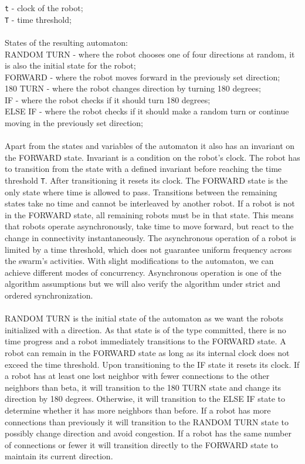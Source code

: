 \texttt{t} - clock of the robot;\\
\texttt{T} - time threshold;
\\\\
States of the resulting automaton:\\
RANDOM TURN - where the robot chooses one of four directions at random, it is also the initial state for the robot;\\
FORWARD - where the robot moves forward in the previously set direction;\\
180 TURN - where the robot changes direction by turning 180 degrees;\\
IF - where the robot checks if it should turn 180 degrees; \\
ELSE IF - where the robot checks if it should make a random turn or continue moving in the previously set direction;
\\\\
Apart from the states and variables of the automaton it also has an invariant on the FORWARD state. Invariant is a condition on the robot's clock. The robot has to transition from the state with a defined invariant before reaching the time threshold \texttt{T}. After transitioning it resets its clock. The FORWARD state is the only state where time is allowed to pass. Transitions between the remaining states take no time and cannot be interleaved by another robot. If a robot is not in the FORWARD state, all remaining robots must be in that state. This means that robots operate asynchronously, take time to move forward, but react to the change in connectivity instantaneously. The asynchronous operation of a robot is limited by a time threshold, which does not guarantee uniform frequency across the swarm's activities. With slight modifications to the automaton, we can achieve different modes of concurrency. Asynchronous operation is one of the algorithm assumptions but we will also verify the algorithm under strict and ordered synchronization.
\\\\
RANDOM TURN is the initial state of the automaton as we want the robots initialized with a direction. As that state is of the type committed, there is no time progress and a robot immediately transitions to the FORWARD state. A robot can remain in the FORWARD state as long as its internal clock does not exceed the time threshold. Upon transitioning to the IF state it resets its clock. If a robot has at least one lost neighbor with fewer connections to the other neighbors than beta, it will transition to the 180 TURN state and change its direction by 180 degrees. Otherwise, it will transition to the ELSE IF state to determine whether it has more neighbors than before. If a robot has more connections than previously it will transition to the RANDOM TURN state to possibly change direction and avoid congestion. If a robot has the same number of connections or fewer it will transition directly to the FORWARD state to maintain its current direction.
